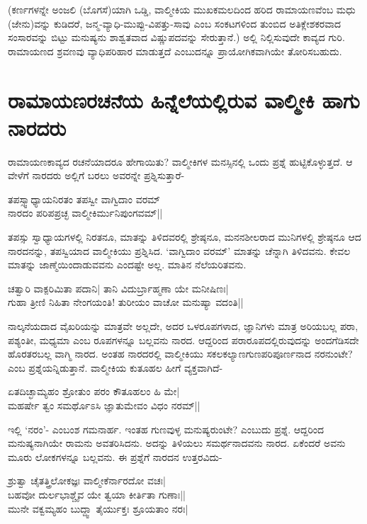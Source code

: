 (ಕರ್ಣಗಳನ್ನೇ ಅಂಜಲಿ (ಬೊಗಸೆ)ಯಾಗಿ ಒಡ್ಡಿ, ವಾಲ್ಮೀಕಿಯ ಮುಖಕಮಲದಿಂದ ಹರಿದ ರಾಮಾಯಣವೆಂಬ ಮಧು (ಜೇನು)ವನ್ನು ಕುಡಿದರೆ, ಜನ್ಮ-ವ್ಯಾಧಿ-ಮುಪ್ಪು-ವಿಪತ್ತು-ಸಾವು ಎಂಬ ಸಂಕಟಗಳಿಂದ ತುಂಬಿದ ಅತಿಕ್ಲೇಶಕರವಾದ ಸಂಸಾರವನ್ನು ಬಿಟ್ಟು ಮನುಷ್ಯನು ಶಾಶ್ವತವಾದ ವಿಷ್ಣುಪದವನ್ನು ಸೇರುತ್ತಾನೆ.) ಅಲ್ಲಿ ನಿಲ್ಲಿಸುವುದೇ ಕಾವ್ಯದ ಗುರಿ. ರಾಮಾಯಣದ ಶ್ರವಣವು ವ್ಯಾಧಿಪರಿಹಾರ ಮಾಡುತ್ತದೆ ಎಂಬುದನ್ನೂ ಪ್ರಾಯೋಗಿಕವಾಗಿಯೇ ತೋರಿಸಬಹುದು. 

\section*{ರಾಮಾಯಣರಚನೆಯ ಹಿನ್ನೆಲೆಯಲ್ಲಿರುವ ವಾಲ್ಮೀಕಿ ಹಾಗು ನಾರದರು} 

ರಾಮಾಯಣಕಾವ್ಯದ ರಚನೆಯಾದರೂ ಹೇಗಾಯಿತು? ವಾಲ್ಮೀಕಿಗಳ ಮನಸ್ಸಿನಲ್ಲಿ ಒಂದು ಪ್ರಶ್ನೆ ಹುಟ್ಟಿಕೊಳ್ಳುತ್ತದೆ. ಆ ವೇಳೆಗೆ ನಾರದರು ಅಲ್ಲಿಗೆ ಬರಲು ಅವರನ್ನೇ ಪ್ರಶ್ನಿಸುತ್ತಾರೆ- 

\begin{shloka} 
ತಪಸ್ಸ್ವಾಧ್ಯಾಯನಿರತಂ ತಪಸ್ವೀ ವಾಗ್ವಿದಾಂ ವರಮ್‍\\ 
ನಾರದಂ ಪರಿಪಪ್ರಚ್ಛ ವಾಲ್ಮೀಕಿರ್ಮುನಿಪುಂಗವಮ್‍||
\end{shloka} 

ತಪಸ್ಸು ಸ್ವಾಧ್ಯಾಯಗಳಲ್ಲಿ ನಿರತನೂ, ಮಾತನ್ನು ತಿಳಿದವರಲ್ಲಿ ಶ್ರೇಷ್ಠನೂ, ಮನನಶೀಲರಾದ ಮುನಿಗಳಲ್ಲಿ ಶ್ರೇಷ್ಠನೂ ಆದ ನಾರದನನ್ನು, ತಪಸ್ವಿಯಾದ ವಾಲ್ಮೀಕಿಯು ಪ್ರಶ್ನಿಸಿದ. `ವಾಗ್ವಿದಾಂ ವರಮ್‍' ಮಾತನ್ನು ಚೆನ್ನಾಗಿ ತಿಳಿದವನು. ಕೇವಲ ಮಾತನ್ನು ಜಾಣ್ಮೆಯಿಂದಾಡುವವನು ಎಂದಷ್ಟೇ ಅಲ್ಲ. ಮಾತಿನ ನೆಲೆಯರಿತವನು. 

\begin{shloka} 
ಚತ್ವಾರಿ ವಾಕ್ಪರಿಮಿತಾ ಪದಾನಿ| ತಾನಿ ವಿದುರ್ಬ್ರಾಹ್ಮಣಾ ಯೇ ಮನೀಷಿಣಃ|\\ 
ಗುಹಾ ತ್ರೀಣಿ ನಿಹಿತಾ ನೇಂಗಯಂತಿ! ತುರೀಯಂ ವಾಚೋ ಮನುಷ್ಯಾ  ವದಂತಿ||
\end{shloka} 

ನಾಲ್ಕನೆಯದಾದ ವೈಖರಿಯನ್ನು ಮಾತ್ರವೇ ಅಲ್ಲದೇ, ಅದರ ಒಳರೂಪಗಳಾದ, ಜ್ಞಾನಿಗಳು ಮಾತ್ರ ಅರಿಯಬಲ್ಲ ಪರಾ, ಪಶ್ಯಂತೀ, ಮಧ್ಯಮಾ ಎಂಬ ರೂಪಗಳನ್ನೂ ಬಲ್ಲವನು ನಾರದ. ಆದ್ದರಿಂದ ಪರಾರೂಪದಲ್ಲಿರುವುದನ್ನು ಅಂದಗೆಡಿಸದೇ ಹೊರತರಬಲ್ಲ ವಾಗ್ಮಿ ನಾರದ. ಅಂತಹ ನಾರದರಲ್ಲಿ ವಾಲ್ಮೀಕಿಯು ಸಕಲಕಲ್ಯಾಣಗುಣಪರಿಪೂರ್ಣನಾದ ನರನುಂಟೇ? ಎಂಬ ಪ್ರಶ್ನೆಯನ್ನಿಡುತ್ತಾನೆ. ವಾಲ್ಮೀಕಿಯ ಕುತೂಹಲ ಹೀಗೆ ವ್ಯಕ್ತವಾಗಿದೆ- 

\begin{shloka} 
ಏತದಿಚ್ಛಾಮ್ಯಹಂ ಶ್ರೋತುಂ ಪರಂ ಕೌತೂಹಲಂ ಹಿ ಮೇ|\\ 
ಮಹರ್ಷೇ ತ್ವಂ ಸಮರ್ಥೊಽಸಿ ಜ್ಞಾತುಮೇವಂ ವಿಧಂ ನರಮ್‍||
\end{shloka} 

ಇಲ್ಲಿ `ನರಂ'- ಎಂಬಂಶ ಗಮನಾರ್ಹ. ಇಂತಹ ಗುಣವುಳ್ಳ ಮನುಷ್ಯರುಂಟೇ? ಎಂಬುದು ಪ್ರಶ್ನೆ. ಆದ್ದರಿಂದ ಮನುಷ್ಯನಾಗಿಯೇ ರಾಮನು ಅವತರಿಸಿದನು. ಅದನ್ನು ತಿಳಿಯಲು ಸಮರ್ಥನಾದವನು ನಾರದ. ಏಕೆಂದರೆ ಅವನು ಮೂರು ಲೋಕಗಳನ್ನೂ ಬಲ್ಲವನು. ಈ ಪ್ರಶ್ನೆಗೆ ನಾರದನ ಉತ್ತರವಿದು- 

\begin{shloka} 
ಶ್ರುತ್ವಾ ಚೈತತ್ತ್ರಿಲೋಕಜ್ಞಃ ವಾಲ್ಮೀಕೆರ್ನಾರದೋ ವಚಃ|\\ 
ಬಹವೋ ದುರ್ಲಭಾಶ್ಚೈವ ಯೇ ತ್ವಯಾ ಕೀರ್ತಿತಾ ಗುಣಾಃ||\\ 
ಮುನೇ ವಕ್ವಮ್ಯಹಂ ಬುದ್ದ್ವಾ ತೈರ್ಯುಕ್ತಃ ಶ್ರೂಯತಾಂ ನರಃ|
\end{shloka} 

